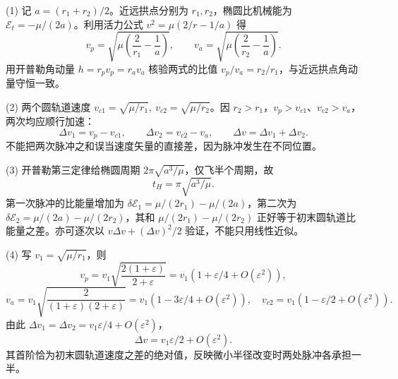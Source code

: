 (1) 记 \(a=(r_1+r_2)/2\)。近远拱点分别为 \(r_1,r_2\)，椭圆比机械能为 \(\mathcal E_t=-\mu/(2a)\)。利用活力公式 \(v^2=\mu(2/r-1/a)\) 得
\[
v_p=\sqrt{\mu\left(\frac2{r_1}-\frac1a\right)},\qquad
v_a=\sqrt{\mu\left(\frac2{r_2}-\frac1a\right)}.
\]
用开普勒角动量 \(h=r_pv_p=r_av_a\) 核验两式的比值 \(v_p/v_a=r_2/r_1\)，与近远拱点角动量守恒一致。

(2) 两个圆轨道速度 \(v_{c1}=\sqrt{\mu/r_1},\ v_{c2}=\sqrt{\mu/r_2}\)。因 \(r_2>r_1\)，\(v_p>v_{c1}\)、\(v_{c2}>v_a\)，两次均应顺行加速：
\[
\Delta v_1=v_p-v_{c1},\qquad \Delta v_2=v_{c2}-v_a,\qquad
\Delta v=\Delta v_1+\Delta v_2.
\]
不能把两次脉冲之和误当速度矢量的直接差，因为脉冲发生在不同位置。

(3) 开普勒第三定律给椭圆周期 \(2\pi\sqrt{a^3/\mu}\)，仅飞半个周期，故
\[
t_H=\pi\sqrt{a^3/\mu}.
\]
第一次脉冲的比能量增加为 \(\delta\mathcal E_1=\mu/(2r_1)-\mu/(2a)\)，第二次为 \(\delta\mathcal E_2=\mu/(2a)-\mu/(2r_2)\)，其和 \(\mu/(2r_1)-\mu/(2r_2)\) 正好等于初末圆轨道比能量之差。亦可逐次以 \(v\Delta v+(\Delta v)^2/2\) 验证，不能只用线性近似。

(4) 写 \(v_1=\sqrt{\mu/r_1}\)，则
\[
v_p=v_1\sqrt{\frac{2(1+\varepsilon)}{2+\varepsilon}}
=v_1(1+\varepsilon/4+O(\varepsilon^2)),
\]
\[
v_a=v_1\sqrt{\frac{2}{(1+\varepsilon)(2+\varepsilon)}}
=v_1(1-3\varepsilon/4+O(\varepsilon^2)),
\quad v_{c2}=v_1(1-\varepsilon/2+O(\varepsilon^2)).
\]
由此 \(\Delta v_1=\Delta v_2=v_1\varepsilon/4+O(\varepsilon^2)\)，
\[
\Delta v=v_1\varepsilon/2+O(\varepsilon^2).
\]
其首阶恰为初末圆轨道速度之差的绝对值，反映微小半径改变时两处脉冲各承担一半。
